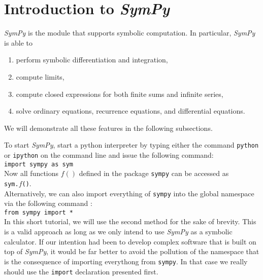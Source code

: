\documentclass{article}
\begin{document}
\section{Introduction to \textsl{SymPy}}
\textsl{SymPy} is the module that supports symbolic computation.  In particular, \textsl{SymPy} is able to
\begin{enumerate}
\item perform symbolic differentiation and integration,
\item compute limits,
\item compute closed expressions for both finite sums and infinite  series,
\item solve ordinary equations, recurrence equations, and differential equations.
\end{enumerate}
We will demonstrate all these features in the following subsections.

To start \textsl{SymPy}, start a python interpreter by typing either the command \texttt{python} or \texttt{ipython} 
on the command line and issue the following command:
\\[0.2cm]
\hspace*{1.3cm}
\texttt{import sympy as sym}
\\[0.2cm]
Now all functions $f()$ defined in the package \texttt{sympy} can be accessed as
\\[0.2cm]
\hspace*{1.3cm}
\texttt{sym.$f$()}.
\\[0.2cm]
Alternatively, we can also import everything of \texttt{sympy} into the global namespace via the
following command :
\\[0.2cm]
\hspace*{1.3cm}
\texttt{from sympy import *}
\\[0.2cm]
In this short tutorial, we will use the second method for the sake of brevity.  This is a valid
approach as long as we only intend to use \textsl{SymPy} as a symbolic calculator.  If our intention
had been to develop complex software that is built on top of \textsl{SymPy}, it would be far better
to avoid the pollution of the namespace that is the consequence of importing everythong from
\texttt{sympy}.  In that case we really should use the \texttt{import} declaration presented first.
\end{document}
